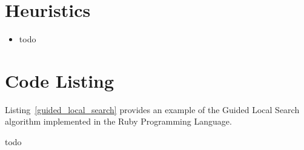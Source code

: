 \documentclass[a4paper, 11pt]{article}
\begin{document}
\section{Heuristics}
\label{sec:heuristics}
\begin{itemize}
	\item todo
\end{itemize}

\section{Code Listing}
\label{sec:code}
Listing~\ref{guided_local_search} provides an example of the Guided Local Search algorithm implemented in the Ruby Programming Language.

todo




\end{document}
